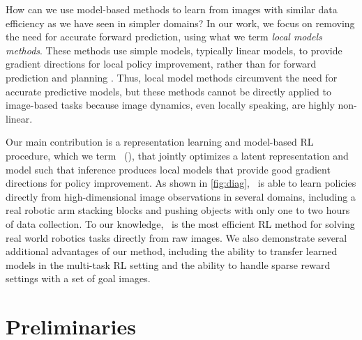 How can we use model-based methods to learn from images with similar data efficiency as we have seen in simpler domains? In our work, we focus on removing the need for accurate forward prediction, using what we term \emph{local models methods}. These methods use simple models, typically linear models, to provide gradient directions for local policy improvement, rather than for forward prediction and planning \citep{ilqg,mfcgps}. Thus, local model methods circumvent the need for accurate predictive models, but these methods cannot be directly applied to image-based tasks because image dynamics, even locally speaking, are highly non-linear.

Our main contribution is a representation learning and model-based RL procedure, which we term \methodname\ (\metabbr), that jointly optimizes a latent representation and model such that inference produces local models that provide good gradient directions for policy improvement. As shown in \autoref{fig:diag}, \metabbr\ is able to learn policies directly from high-dimensional image observations in several domains, including a real robotic arm stacking blocks and pushing objects with only one to two hours of data collection. To our knowledge, \metabbr\ is the most efficient RL method for solving real world robotics tasks directly from raw images. We also demonstrate several additional advantages of our method, including the ability to transfer learned models in the multi-task RL setting and the ability to handle sparse reward settings with a set of goal images.


\section{Preliminaries}
\label{sec:prelim}

